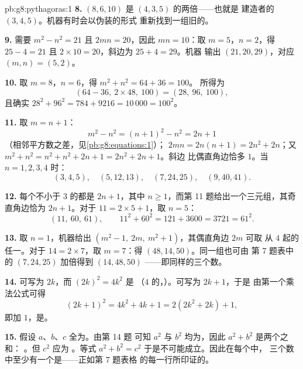 \begin{solution}{pb:g8:pythagoras:1}
\textbf{8.} $(8, 6, 10)$ 是 $(4, 3, 5)$ 的两倍——也就是
建造者的 $(3, 4, 5)$。机器有时会以伪装的形式
重新找到一组旧的。

\textbf{9.} 需要 $m^2 - n^2 = 21$ 且 $2mn = 20$，因此
$mn = 10$：取 $m = 5$，$n = 2$，得 $25 - 4 = 21$ 且
$2 \times 10 = 20$，斜边为 $25 + 4 = 29$。机器
输出 $(21, 20, 29)$，对应 $(m, n) = (5, 2)$。

\textbf{10.} 取 $m = 8$，$n = 6$，得 $m^2 + n^2 = 64 + 36 = 100$。
所得为
\[
\left(64 - 36,\ 2 \times 48,\ 100\right) = (28,\ 96,\ 100),
\]
且确实 $28^2 + 96^2 = 784 + 9216 = 10\,000 = 100^2$。

\textbf{11.} 取 $m = n + 1$：
\[
m^2 - n^2 = (n + 1)^2 - n^2 = 2n + 1
\]
（相邻平方数之差，见\cref{pb:g8:equations:1}）；
$2mn = 2n(n + 1) = 2n^2 + 2n$；又
$m^2 + n^2 = n^2 + n^2 + 2n + 1 = 2n^2 + 2n + 1$。斜边
比偶直角边恰多 $1$。当 $n = 1, 2, 3, 4$ 时：
\[
(3, 4, 5), \quad (5, 12, 13), \quad (7, 24, 25), \quad
(9, 40, 41) .
\]

\textbf{12.} 每个不小于 $3$ 的都是 $2n + 1$，其中
$n \geq 1$，而第 11 题给出一个三元组，其奇直角边恰为
$2n + 1$。对于 $11 = 2 \times 5 + 1$，取 $n = 5$：
\[
(11,\ 60,\ 61),
\qquad
11^2 + 60^2 = 121 + 3600 = 3721 = 61^2 .
\]

\textbf{13.} 取 $n = 1$，机器给出
$\left(m^2 - 1,\ 2m,\ m^2 + 1\right)$，其偶直角边 $2m$ 可取
从 $4$ 起的任一。对于 $14 = 2 \times 7$，取
$m = 7$：得 $(48, 14, 50)$。同一组也可由
第 7 题表中的 $(7, 24, 25)$ 加倍得到 $(14, 48, 50)$
——即同样的三个数。

\textbf{14.} 可写为 $2k$，而 $(2k)^2 = 4k^2$ 是
（$4$ 的，）。可写为 $2k + 1$，于是
由第一个乘法公式可得
\[
(2k + 1)^2 = 4k^2 + 4k + 1 = 2\left(2k^2 + 2k\right) + 1 ,
\]
即加 $1$，是。

\textbf{15.} 假设 $a$、$b$、$c$ 全为。由第 14 题
可知 $a^2$ 与 $b^2$ 均为，因此 $a^2 + b^2$ 是两个之和：
\emph{}。但 $c^2$ 应为 \emph{}。等式
$a^2 + b^2 = c^2$ 于是不可能成立。因此在每个中，
三个数中至少有一个是——正如第 7 题表格
的每一行所印证的。
\end{solution}
